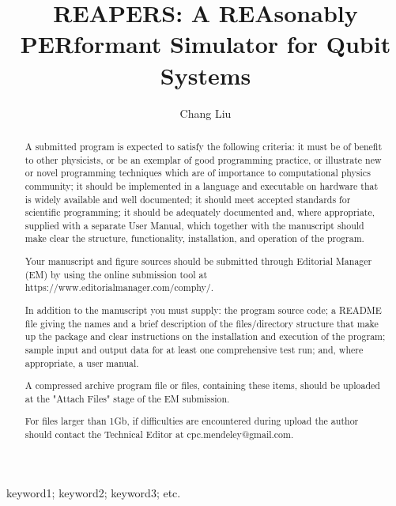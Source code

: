 \documentclass[preprint,12pt]{elsarticle}
\begin{document}
\begin{frontmatter}



\title{REAPERS: A REAsonably PERformant Simulator for Qubit Systems}

\author{Chang Liu}
\address{Shanghai Center for Complex Physics, School of Physics and Astronomy,\\Shanghai Jiaotong University, Shanghai, China 200240}

\begin{abstract}
A submitted program is expected to satisfy the following criteria: it must be of benefit to other physicists, or be an exemplar of good programming practice, or illustrate new or novel programming techniques which are of importance to computational physics community; it should be implemented in a language and executable on hardware that is widely available and well documented; it should meet accepted standards for scientific programming; it should be adequately documented and, where appropriate, supplied with a separate User Manual, which together with the manuscript should make clear the structure, functionality, installation, and operation of the program.

Your manuscript and figure sources should be submitted through Editorial Manager (EM) by using the online submission tool at \\
https://www.editorialmanager.com/comphy/.

In addition to the manuscript you must supply: the program source code; a README file giving the names and a brief description of the files/directory structure that make up the package and clear instructions on the installation and execution of the program; sample input and output data for at least one comprehensive test run; and, where appropriate, a user manual.

A compressed archive program file or files, containing these items, should be uploaded at the "Attach Files" stage of the EM submission.

For files larger than 1Gb, if difficulties are encountered during upload the author should contact the Technical Editor at cpc.mendeley@gmail.com.

\end{abstract}

\begin{keyword}
keyword1; keyword2; keyword3; etc.

\end{keyword}

\end{frontmatter}
\end{document}
